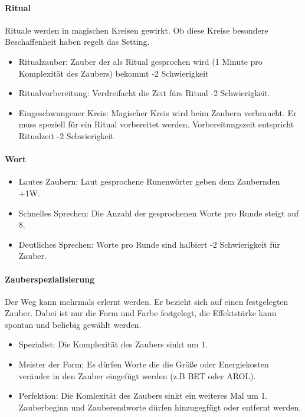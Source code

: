 \documentclass{article}
\begin{document}
\paragraph{Ritual}

Rituale werden in magischen Kreisen gewirkt. Ob diese Kreise besondere Beschaffenheit haben regelt das Setting.

\begin{itemize}
\item Ritualzauber: Zauber der als Ritual gesprochen wird (1 Minute pro Komplexität des Zaubers) bekommt -2 Schwierigkeit
\item Ritualvorbereitung: Verdreifacht die Zeit fürs Ritual -2 Schwierigkeit.
\item Eingeschwungener Kreis: Magischer Kreis wird beim Zaubern verbraucht. Er muss speziell für ein Ritual vorbereitet werden. Vorbereitungszeit entspricht Ritualzeit -2 Schwierigkeit
\end{itemize}

\paragraph{Wort}

\begin{itemize}
\item Lautes Zaubern: Laut gesprochene Runenwörter geben dem Zaubernden +1W.
\item Schnelles Sprechen: Die Anzahl der gesprochenen Worte pro Runde steigt auf 8.
\item Deutliches Sprechen: Worte pro Runde sind halbiert -2 Schwierigkeit für Zauber.
\end{itemize}

\paragraph{Zauberspezialisierung}

Der Weg kann mehrmals erlernt werden. Er bezieht sich auf einen festgelegten Zauber. Dabei ist nur die Form und
Farbe festgelegt, die Effektstärke kann spontan und beliebig gewählt werden.

\begin{itemize}
\item Spezialist: Die Komplexität des Zaubers sinkt um 1.
\item Meister der Form: Es dürfen Worte die die Größe oder Energiekosten veränder in den Zauber eingefügt werden (z.B BET oder AROL).
\item Perfektion: Die Komlexität des Zaubers sinkt ein weiteres Mal um 1. Zauberbeginn und Zauberendworte dürfen hinzugegfügt oder entfernt werden.
\end{itemize}
\end{document}
